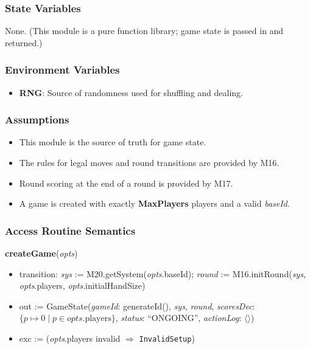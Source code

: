 \documentclass[12pt, titlepage]{article}
\begin{document}
\subsubsection{State Variables}
None. (This module is a pure function library; game state is passed in and returned.)

\subsubsection{Environment Variables}
\begin{itemize}
    \item \textbf{RNG}: Source of randomness used for shuffling and dealing.
\end{itemize}

\subsubsection{Assumptions}
\begin{itemize}
    \item This module is the source of truth for game state.
    \item The rules for legal moves and round transitions are provided by M16.
    \item Round scoring at the end of a round is provided by M17.
    \item A game is created with exactly \textbf{MaxPlayers} players and a valid \textit{baseId}.
\end{itemize}

\subsubsection{Access Routine Semantics}

\noindent\textbf{createGame}(\textit{opts})
\begin{itemize}
    \item transition: \textit{sys} := M20.getSystem(\textit{opts}.baseId); \textit{round} := M16.initRound(\textit{sys}, \textit{opts}.players, \textit{opts}.initialHandSize)
    \item out := GameState(\textit{gameId}: generateId(), \textit{sys}, \textit{round}, \textit{scoresDec}: $\{p \mapsto 0 \mid p \in \textit{opts}.\text{players}\}$, \textit{status}: ``ONGOING'', \textit{actionLog}: $\langle\rangle$)
    \item exc := (\textit{opts}.players invalid $\Rightarrow$ \texttt{InvalidSetup})
\end{itemize}
\end{document}

